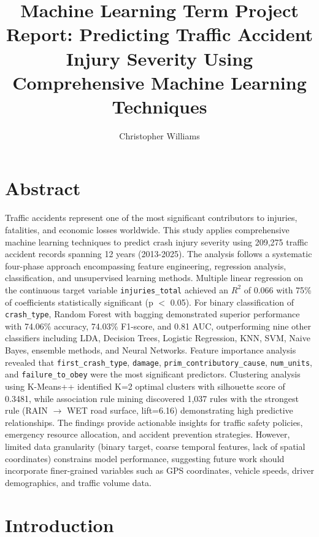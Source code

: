 \documentclass[12pt,man]{apa7}
\title{Machine Learning Term Project Report: Predicting Traffic Accident Injury Severity Using Comprehensive Machine Learning Techniques}
\author{Christopher Williams}
\affiliation{Virginia Tech}
\begin{document}
\maketitle

\tableofcontents

\listoffigures
\listoftables

\section{Abstract}

Traffic accidents represent one of the most significant contributors to injuries, fatalities, and economic losses worldwide. This study applies comprehensive machine learning techniques to predict crash injury severity using 209,275 traffic accident records spanning 12 years (2013-2025). The analysis follows a systematic four-phase approach encompassing feature engineering, regression analysis, classification, and unsupervised learning methods. Multiple linear regression on the continuous target variable \texttt{injuries\_total} achieved an $R^2$ of 0.066 with 75\% of coefficients statistically significant (p $<$ 0.05). For binary classification of \texttt{crash\_type}, Random Forest with bagging demonstrated superior performance with 74.06\% accuracy, 74.03\% F1-score, and 0.81 AUC, outperforming nine other classifiers including LDA, Decision Trees, Logistic Regression, KNN, SVM, Naive Bayes, ensemble methods, and Neural Networks. Feature importance analysis revealed that \texttt{first\_crash\_type}, \texttt{damage}, \texttt{prim\_contributory\_cause}, \texttt{num\_units}, and \texttt{failure\_to\_obey} were the most significant predictors. Clustering analysis using K-Means++ identified K=2 optimal clusters with silhouette score of 0.3481, while association rule mining discovered 1,037 rules with the strongest rule (RAIN $\rightarrow$ WET road surface, lift=6.16) demonstrating high predictive relationships. The findings provide actionable insights for traffic safety policies, emergency resource allocation, and accident prevention strategies. However, limited data granularity (binary target, coarse temporal features, lack of spatial coordinates) constrains model performance, suggesting future work should incorporate finer-grained variables such as GPS coordinates, vehicle speeds, driver demographics, and traffic volume data.

\section{Introduction}
\end{document}
